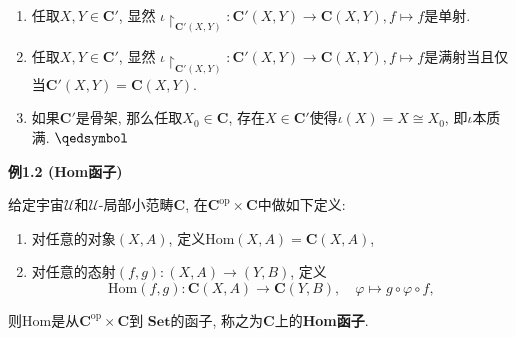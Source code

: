 \documentclass[UTF8]{ctexart}
\begin{document}

\begin{enumerate}
    \item 任取$X,Y\in\mathbf{C}'$, 显然
    $\iota\!\restriction_{\mathbf{C'}(X,Y)}:\mathbf{C'}(X,Y)\to\mathbf{C}(X,Y),
    f\mapsto f$是单射.
    \item 任取$X,Y\in\mathbf{C}'$, 显然
    $\iota\!\restriction_{\mathbf{C'}(X,Y)}:\mathbf{C'}(X,Y)\to\mathbf{C}(X,Y),
    f\mapsto f$是满射当且仅当$\mathbf{C'}(X,Y)=\mathbf{C}(X,Y)$.
    \item 如果$\mathbf{C}'$是骨架, 那么任取$X_0\in\mathbf{C}$,
    存在$X\in\mathbf{C}'$使得$\iota(X)=X\cong X_0$, 即$\iota$本质满.
    \hfill $\qedsymbol$
\end{enumerate}

\vspace{10pt}

\hypertarget{sec:例1.2}{}
\noindent\textbf{例1.2 (Hom函子)}

给定宇宙$\mathcal{U}$和$\mathcal{U}$-局部小范畴$\mathbf{C}$,
在$\mathbf{C}^{\mathrm{op}}\times\mathbf{C}$中做如下定义:
\begin{enumerate}
    \item 对任意的对象$(X,A)$, 定义$\mathrm{Hom}(X,A)=\mathbf{C}(X,A)$,
    \item 对任意的态射$(f,g):(X,A)\to(Y,B)$, 定义
    \[
        \mathrm{Hom}(f,g):\mathbf{C}(X,A)\to\mathbf{C}(Y,B),\quad
        \varphi\mapsto g\circ\varphi\circ f,
    \]
\end{enumerate}
则$\mathrm{Hom}$是从$\mathbf{C}^{\mathrm{op}}\times\mathbf{C}$到
$\mathbf{Set}$的函子, 称之为$\mathbf{C}$上的\textbf{Hom函子}.

\end{document}
